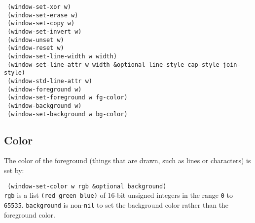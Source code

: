 \vspace{-0.1in}
{\tt \hspace*{0.5in} (window-set-xor w)} \\
{\tt \hspace*{0.5in} (window-set-erase w)} \\
{\tt \hspace*{0.5in} (window-set-copy w)} \\
{\tt \hspace*{0.5in} (window-set-invert w)} \\
{\tt \hspace*{0.5in} (window-unset w)} \\
{\tt \hspace*{0.5in} (window-reset w)} \\

{\tt \hspace*{0.5in} (window-set-line-width w width)} \\
{\tt \hspace*{0.5in} (window-set-line-attr w width \&optional line-style cap-style join-style)} \\
{\tt \hspace*{0.5in} (window-std-line-attr w)} \\

{\tt \hspace*{0.5in} (window-foreground w)} \\
{\tt \hspace*{0.5in} (window-set-foreground w fg-color)} \\
{\tt \hspace*{0.5in} (window-background w)} \\
{\tt \hspace*{0.5in} (window-set-background w bg-color)} \\


\subsection{Color}

The color of the foreground (things that are drawn, such as lines or
characters) is set by:

{\tt \hspace*{0.5in} (window-set-color w rgb \&optional background)} \\

{\tt rgb} is a list {\tt (red green blue)} of 16-bit unsigned integers in
the range {\tt 0} to {\tt 65535}.  {\tt background} is non-{\tt nil}
to set the background color rather than the foreground color.

